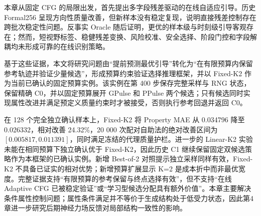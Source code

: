 本章从固定 CFG 的局限出发，首先提出多字段残差驱动的在线自适应引导。历史 Formal256 呈现方向性质量改善，但新样本没有稳定复现，说明直接残差控制存在跨批次稳定性问题。反事实 Oracle 随后证明，更优的样本级与时刻级引导客观存在；然而，短视野标签、稳健残差变换、风险校准、安全选择、阶段门控和字段解耦均未形成可靠的在线识别策略。

基于这些证据，本文将研究问题由``提前预测最优引导''转化为``在有限预算内保留参考轨迹并验证少量候选''，形成预算约束验证选择推理框架，并以 Fixed-K2 作为当前已确认的固定预算实例。该实例在第 400 步保存完整采样与 RNG 状态，保留精确 C0，并以固定预算展开 GPulse 和 PPulse 两个候选；只有候选同时实现属性改进并满足预定义质量约束时才被接受，否则执行参考回退并返回 C0。

在 128 个完全独立确认样本上，Fixed-K2 将 Property MAE 从 0.034796 降至 0.026332，相对改善 24.32\%，20 000 次配对自助法的绝对改善区间为 \([0.005817,0.011391]\)，同时满足冻结的代理质量护栏。进一步的 Linear-K2 实验未能在相同预算下独立确认优于 Fixed-K2，因此历史 C1 继续保留固定双候选策略作为本框架的已确认实例。新增 Best-of-2 对照提示独立采样同样有效，Fixed-K2 不具备已证实的相对优势；新增预算扩展显示 K=2 是成本折中而非最优宽度。完整证据支持``有限预算的参考保留与终点选择有效''，但不支持``在线 Adaptive CFG 已被稳定验证''或``学习型候选分配具有额外价值''。本章主要解决条件属性控制问题；属性条件满足并不等价于生成结构处于低受力状态，因此第4章进一步研究后期神经力场反馈对局部结构一致性的影响。
